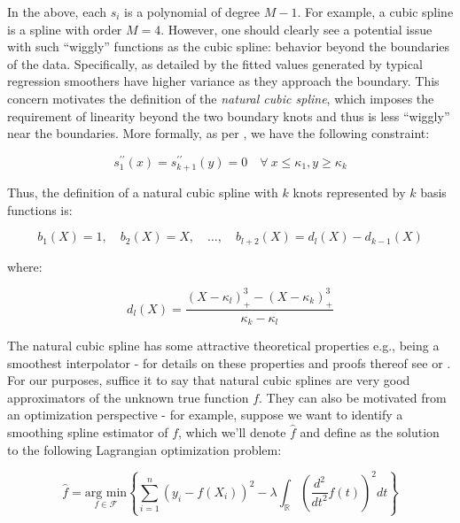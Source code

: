 \documentclass{report}
\begin{document}
In the above, each $s_i$ is a polynomial of degree $M-1$. For example, a cubic spline is a spline with order $M=4$. However, one should clearly see a potential issue with such ``wiggly'' functions as the cubic spline: behavior beyond the boundaries of the data. Specifically, as detailed by \cite[Chapter~2.9]{hastie_generalized_1990} the fitted values generated by typical regression smoothers have higher variance as they approach the boundary. This concern motivates the definition of the \textit{natural cubic spline}, which imposes the requirement of linearity beyond the two boundary knots and thus is less ``wiggly'' near the boundaries. More formally, as per \cite[Lecture~7]{molstad_sta_2022}, we have the following constraint:

\begin{equation}\label{eq:glm-gam-linearity-constraint}
    s_1^{\prime\prime}(x) = s_{k+1}^{\prime\prime}(y) = 0 \quad \forall \: x \le \kappa_1, y \ge \kappa_k
\end{equation}

Thus, the definition of a natural cubic spline with $k$ knots represented by $k$ basis functions is:

\begin{equation}\label{eq:glm-gam-natural-cubic-spline-1}
    b_1(X) = 1, \quad b_2(X) = X, \quad \dots, \quad b_{l+2}(X) = d_l(X) - d_{k-1}(X)
\end{equation}

where:

\begin{equation}\label{eq:glm-gam-natural-cubic-spline-2}
    d_l(X) = \frac{(X - \kappa_l)_+^3 - (X - \kappa_k)_+^3}{\kappa_k - \kappa_l}
\end{equation}

The natural cubic spline has some attractive theoretical properties e.g., being a smoothest interpolator - for details on these properties and proofs thereof see \cite[Chapter~5.1.1]{wood_generalized_2017} or \cite[Lecture~7]{molstad_sta_2022}. For our purposes, suffice it to say that natural cubic splines are very good approximators of the unknown true function $f$. They can also be motivated from an optimization perspective - for example, suppose we want to identify a smoothing spline estimator of $f$, which we'll denote $\hat{f}$ and define as the solution to the following Lagrangian optimization problem:

\begin{equation}\label{eq:glm-gam-smoothing-spline-optimizer}
    \hat{f} = \underset{f \in \mathcal{F}}{\text{arg min}} \left\{\sum_{i=1}^n \left(y_i - f(X_i)\right)^2 - \lambda \int_{\mathbb{R}} \left(\frac{d^2}{dt^2} f(t)\right)^2 dt \right\}
\end{equation}
\end{document}
